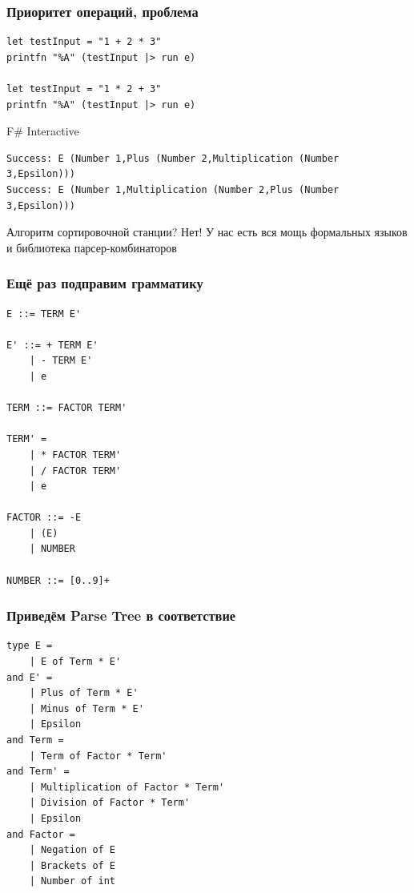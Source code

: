 \documentclass[xetex,mathserif,serif]{beamer}
\begin{document}
    \begin{frame}[fragile]
        \frametitle{Приоритет операций, проблема}
        \begin{small}
            \begin{verbatim}
let testInput = "1 + 2 * 3"
printfn "%A" (testInput |> run e)

let testInput = "1 * 2 + 3"
printfn "%A" (testInput |> run e)
            \end{verbatim}

            \begin{exampleblock}{F\# Interactive}
                \begin{verbatim}
Success: E (Number 1,Plus (Number 2,Multiplication (Number 3,Epsilon)))
Success: E (Number 1,Multiplication (Number 2,Plus (Number 3,Epsilon)))
                \end{verbatim}
            \end{exampleblock}
            Алгоритм сортировочной станции? Нет! У нас есть вся мощь формальных языков и библиотека парсер-комбинаторов
        \end{small}
    \end{frame}

    \begin{frame}[fragile]
        \frametitle{Ещё раз подправим грамматику}
        \begin{small}
            \begin{verbatim}
E ::= TERM E'

E' ::= + TERM E'
    | - TERM E'
    | e

TERM ::= FACTOR TERM'

TERM' = 
    | * FACTOR TERM'
    | / FACTOR TERM'
    | e

FACTOR ::= -E
    | (E)
    | NUMBER

NUMBER ::= [0..9]+
            \end{verbatim}
        \end{small}
    \end{frame}

    \begin{frame}[fragile]
        \frametitle{Приведём Parse Tree в соответствие}
        \begin{small}
            \begin{verbatim}
type E =
    | E of Term * E'
and E' =
    | Plus of Term * E'
    | Minus of Term * E'
    | Epsilon
and Term = 
    | Term of Factor * Term'
and Term' =
    | Multiplication of Factor * Term'
    | Division of Factor * Term'
    | Epsilon
and Factor =
    | Negation of E
    | Brackets of E
    | Number of int
            \end{verbatim}
        \end{small}
    \end{frame}
\end{document}
